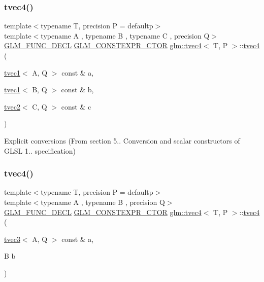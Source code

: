 \subsubsection{\texorpdfstring{tvec4()}{tvec4()}\hspace{0.1cm}{\footnotesize\ttfamily [14/35]}}
{\footnotesize\ttfamily template$<$typename T, precision P = defaultp$>$ \\
template$<$typename A , typename B , typename C , precision Q$>$ \\
\mbox{\hyperlink{setup_8hpp_ab2d052de21a70539923e9bcbf6e83a51}{G\+L\+M\+\_\+\+F\+U\+N\+C\+\_\+\+D\+E\+CL}} \mbox{\hyperlink{setup_8hpp_ad34178a09666081abdb573c14d1f4a5a}{G\+L\+M\+\_\+\+C\+O\+N\+S\+T\+E\+X\+P\+R\+\_\+\+C\+T\+OR}} \mbox{\hyperlink{structglm_1_1tvec4}{glm\+::tvec4}}$<$ T, P $>$\+::\mbox{\hyperlink{structglm_1_1tvec4}{tvec4}} (\begin{DoxyParamCaption}\item[{\mbox{\hyperlink{structglm_1_1tvec1}{tvec1}}$<$ A, Q $>$ const \&}]{a,  }\item[{\mbox{\hyperlink{structglm_1_1tvec1}{tvec1}}$<$ B, Q $>$ const \&}]{b,  }\item[{\mbox{\hyperlink{structglm_1_1tvec2}{tvec2}}$<$ C, Q $>$ const \&}]{c }\end{DoxyParamCaption})}



Explicit conversions (From section 5.. Conversion and scalar constructors of G\+L\+SL 1.. specification) 

\mbox{\label{structglm_1_1tvec4_abf6fb7c4a9dcaba61d1a898c86ed4a3b}} 
\subsubsection{\texorpdfstring{tvec4()}{tvec4()}\hspace{0.1cm}{\footnotesize\ttfamily [15/35]}}
{\footnotesize\ttfamily template$<$typename T, precision P = defaultp$>$ \\
template$<$typename A , typename B , precision Q$>$ \\
\mbox{\hyperlink{setup_8hpp_ab2d052de21a70539923e9bcbf6e83a51}{G\+L\+M\+\_\+\+F\+U\+N\+C\+\_\+\+D\+E\+CL}} \mbox{\hyperlink{setup_8hpp_ad34178a09666081abdb573c14d1f4a5a}{G\+L\+M\+\_\+\+C\+O\+N\+S\+T\+E\+X\+P\+R\+\_\+\+C\+T\+OR}} \mbox{\hyperlink{structglm_1_1tvec4}{glm\+::tvec4}}$<$ T, P $>$\+::\mbox{\hyperlink{structglm_1_1tvec4}{tvec4}} (\begin{DoxyParamCaption}\item[{\mbox{\hyperlink{structglm_1_1tvec3}{tvec3}}$<$ A, Q $>$ const \&}]{a,  }\item[{B}]{b }\end{DoxyParamCaption})}



